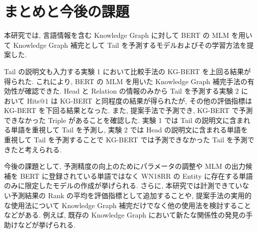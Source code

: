 \newpage
\changeindent{0cm}
\section{まとめと今後の課題}
\changeindent{2cm}

本研究では, 言語情報を含む Knowledge Graph に対して BERT の MLM を用いて Knowledge Graph 補完として Tail を予測するモデルおよびその学習方法を提案した. \par
Tail の説明文も入力する実験 1 において比較手法の KG-BERT を上回る結果が得られた. これにより, BERT の MLM を用いた Knowledge Graph 補完手法の有効性が確認できた. Head と Relation の情報のみから Tail を予測する実験 2 において Hits@$1$ は KG-BERT と同程度の結果が得られたが, その他の評価指標は KG-BERT を下回る結果となった. また, 提案手法で予測でき, KG-BERT で予測できなかった Triple があることを確認した. 実験 1 では Tail の説明文に含まれる単語を重視して Tail を予測し, 実験 2 では Head の説明文に含まれる単語を重視して Tail を予測することで KG-BERT では予測できなかった Tail を予測できたと考えられる. \par
今後の課題として, 予測精度の向上のためにパラメータの調整や MLM の出力候補を BERT に登録されている単語ではなく WN18RR の Entity に存在する単語のみに限定したモデルの作成が挙げられる. さらに, 本研究では計測できていない予測結果の Rank の平均を評価指標として追加することや, 提案手法の実用的な使用法について Knowledge Graph 補完だけでなく他の使用法を検討することなどがある. 例えば, 既存の Knowledge Graph において新たな関係性の発見の手助けなどが挙げられる. 
\par
